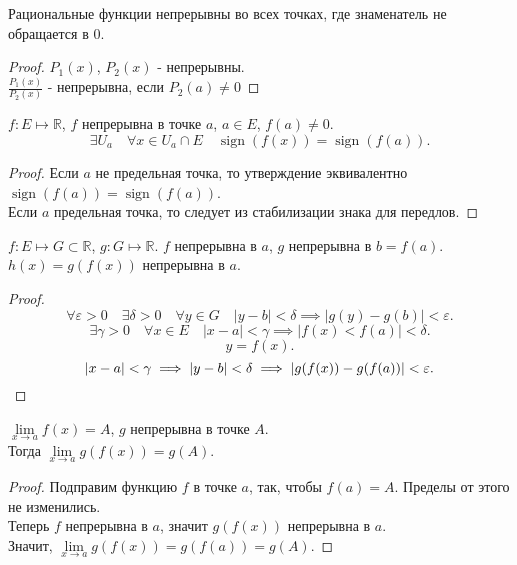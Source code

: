 \documentclass[11pt, oneside]{article}   	%
\DeclareMathOperator{\sgn}{sign}
\begin{document}
    \begin{tlemma}
        Рациональные функции непрерывны во всех точках, где знаменатель не обращается в $0$.
        \begin{proof}
            $P_1(x)$, $ P_2(x)$ - непрерывны.\\
            $\frac{P_1(x)}{P_2(x)}$ - непрерывна, если $P_2(a) \neq 0$
        \end{proof}
    \end{tlemma}
    \begin{theorem}
        $f: E \mapsto \mathbb{R}$, $f$ непрерывна в точке $a$, $a\in E$, $f(a) \neq 0$.
        \[ \exists{U_a}\quad \forall{x\in U_a\cap E}\quad \sgn(f(x)) = \sgn(f(a))   .\]
        \begin{proof}
            Если $a$ не предельная точка, то утверждение эквивалентно $\sgn(f(a)) = \sgn(f(a))$.\\
            Если $a$ предельная точка, то следует из стабилизации знака для передлов.
        \end{proof}
    \end{theorem}
    \begin{theorem}
        $f: E \mapsto G \subset \mathbb{R}$, $g: G \mapsto \mathbb{R}$. $f$ непрерывна в $a$, $g$ непрерывна в $b=f(a)$.\\
        $h(x) = g(f(x))$ непрерывна в $a$.
        \begin{proof}
            \[ \forall{\varepsilon>0}\quad \exists{\delta>0}\quad \forall{y\in G}\quad |y-b|<\delta \implies |g(y)-g(b)| < \varepsilon    .\]
            \[ \exists{\gamma > 0}\quad \forall{x\in E}\quad |x-a|<\gamma \implies |f(x) < f(a)| < \delta  .\]
            \[ y=f(x) .\]
            \[ |x-a|<\gamma \implies |y-b|<\delta \implies |g(f(x))-g(f(a))|<\varepsilon .\qedhere\] 
        \end{proof}
    \end{theorem}
    \begin{tlemma}
        $\lim\limits_{x \to a} f(x) = A$, $g$ непрерывна в точке $A$.\\
        Тогда $\lim\limits_{x \to a} g(f(x)) = g(A)$.\\
        \begin{proof}
            Подправим функцию $f$ в точке $a$, так, чтобы $f(a) = A$. Пределы от этого не изменились.\\
            Теперь $f$ непрерывна в $a$, значит $g(f(x))$ непрерывна в $a$.\\
            Значит, $\lim\limits_{x \to a} g(f(x)) = g(f(a)) = g(A)$.
        \end{proof}
    \end{tlemma}
\end{document}
